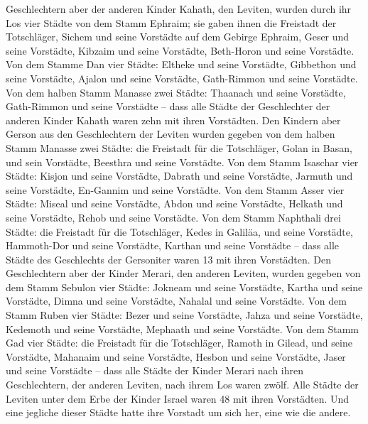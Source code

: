 Geschlechtern aber der anderen Kinder Kahath, den Leviten, wurden durch
ihr Los vier Städte von dem Stamm Ephraim;  sie gaben
ihnen die Freistadt der Totschläger, Sichem und seine Vorstädte auf dem
Gebirge Ephraim, Geser und seine Vorstädte,  Kibzaim und
seine Vorstädte, Beth-Horon und seine Vorstädte.  Von dem
Stamme Dan vier Städte: Eltheke und seine Vorstädte, Gibbethon und seine
Vorstädte,  Ajalon und seine Vorstädte, Gath-Rimmon und
seine Vorstädte.  Von dem halben Stamm Manasse zwei
Städte: Thaanach und seine Vorstädte, Gath-Rimmon und seine Vorstädte --
 dass alle Städte der Geschlechter der anderen Kinder
Kahath waren zehn mit ihren Vorstädten.  Den Kindern aber
Gerson aus den Geschlechtern der Leviten wurden gegeben von dem halben
Stamm Manasse zwei Städte: die Freistadt für die Totschläger, Golan in
Basan, und sein Vorstädte, Beesthra und seine Vorstädte. 
Von dem Stamm Isaschar vier Städte: Kisjon und seine Vorstädte, Dabrath
und seine Vorstädte,  Jarmuth und seine Vorstädte,
En-Gannim und seine Vorstädte.  Von dem Stamm Asser vier
Städte: Miseal und seine Vorstädte, Abdon und seine Vorstädte,
 Helkath und seine Vorstädte, Rehob und seine Vorstädte.
 Von dem Stamm Naphthali drei Städte: die Freistadt für
die Totschläger, Kedes in Galiläa, und seine Vorstädte, Hammoth-Dor und
seine Vorstädte, Karthan und seine Vorstädte --  dass
alle Städte des Geschlechts der Gersoniter waren 13 mit ihren
Vorstädten.  Den Geschlechtern aber der Kinder Merari,
den anderen Leviten, wurden gegeben von dem Stamm Sebulon vier Städte:
Jokneam und seine Vorstädte, Kartha und seine Vorstädte, 
Dimna und seine Vorstädte, Nahalal und seine Vorstädte. 
Von dem Stamm Ruben vier Städte: Bezer und seine Vorstädte, Jahza und
seine Vorstädte,  Kedemoth und seine Vorstädte, Mephaath
und seine Vorstädte.  Von dem Stamm Gad vier Städte: die
Freistadt für die Totschläger, Ramoth in Gilead, und seine Vorstädte,
 Mahanaim und seine Vorstädte, Hesbon und seine
Vorstädte, Jaser und seine Vorstädte --  dass alle Städte
der Kinder Merari nach ihren Geschlechtern, der anderen Leviten, nach
ihrem Los waren zwölf.  Alle Städte der Leviten unter dem
Erbe der Kinder Israel waren 48 mit ihren Vorstädten. 
Und eine jegliche dieser Städte hatte ihre Vorstadt um sich her, eine
wie die andere.

